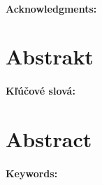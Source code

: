 \documentclass[12pt, twoside]{book}
\theoremstyle{definition}
\theoremstyle{definition}
\theoremstyle{remark}
\begin{document}


\newpage
\pagestyle{plain}
~

\vfill
{\bf Acknowledgments:} 


\newpage
\section*{Abstrakt}


\paragraph*{Kľúčové slová:} 


\newpage
\section*{Abstract}

\paragraph*{Keywords:} 


%
%
%
%
\end{document}
